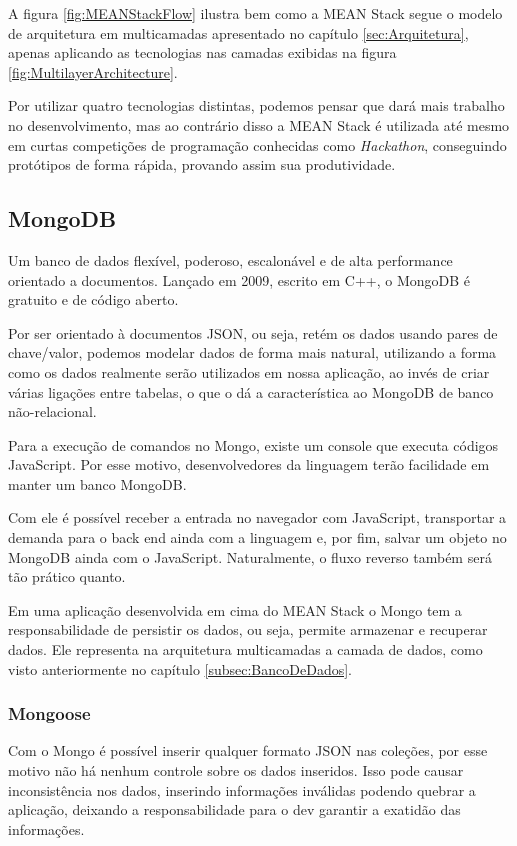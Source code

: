 \documentclass[
	12pt,				%
	openright,			%
	twoside,			%
	a4paper,			%
	english,			%
	brazil				%
	]{abntex2}
\begin{document}
A figura \ref{fig:MEANStackFlow} ilustra bem como a MEAN Stack segue o modelo de arquitetura em multicamadas apresentado no capítulo \ref{sec:Arquitetura}, apenas aplicando as tecnologias nas camadas exibidas na figura \ref{fig:MultilayerArchitecture}.

Por utilizar quatro tecnologias distintas, podemos pensar que dará mais trabalho no desenvolvimento, mas ao contrário disso a MEAN Stack é utilizada até mesmo em curtas competições de programação conhecidas como \textit{Hackathon}, conseguindo protótipos de forma rápida, provando assim sua produtividade.

\subsection{MongoDB}

Um banco de dados flexível, poderoso, escalonável e de alta performance orientado a documentos. Lançado em 2009, escrito em C++, o MongoDB é gratuito e de código aberto.

Por ser orientado à documentos JSON, ou seja, retém os dados usando pares de chave/valor, podemos modelar dados de forma mais natural, utilizando a forma como os dados realmente serão utilizados em nossa aplicação, ao invés de criar várias ligações entre tabelas, o que o dá a característica ao MongoDB de banco não-relacional.

Para a execução de comandos no Mongo, existe um console que executa códigos JavaScript. Por esse motivo, desenvolvedores da linguagem terão facilidade em manter um banco MongoDB.

Com ele é possível receber a entrada no navegador com JavaScript, transportar a demanda para o back end ainda com a linguagem e, por fim, salvar um objeto no MongoDB ainda com o JavaScript. Naturalmente, o fluxo reverso também será tão prático quanto.

Em uma aplicação desenvolvida em cima do MEAN Stack o Mongo tem a responsabilidade de persistir os dados, ou seja, permite armazenar e recuperar dados. Ele representa na arquitetura multicamadas a camada de dados, como visto anteriormente no capítulo \ref{subsec:BancoDeDados}.

\subsubsection{Mongoose}

Com o Mongo é possível inserir qualquer formato JSON nas coleções, por esse motivo não há nenhum controle sobre os dados inseridos. Isso pode causar inconsistência nos dados, inserindo informações inválidas podendo quebrar a aplicação, deixando a responsabilidade para o dev garantir a exatidão das informações.
\end{document}
